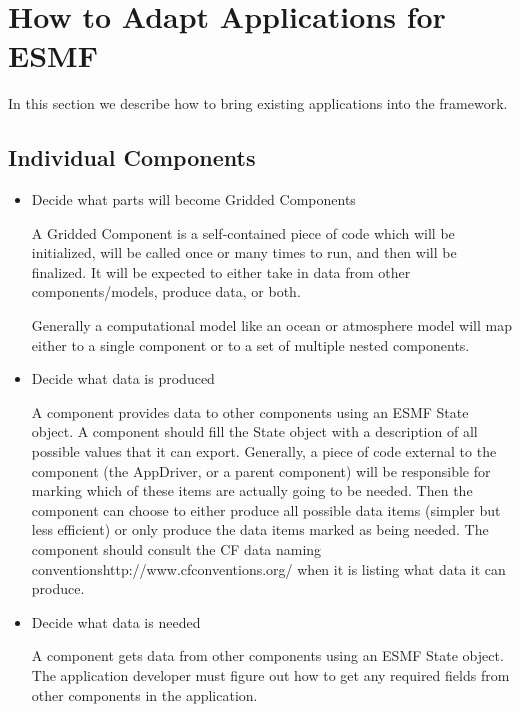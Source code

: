 
\section{How to Adapt Applications for ESMF}
\label{sec:Adoption}

In this section we describe how to bring existing applications 
into the framework.

\subsection{Individual Components}

\begin{itemize}

\item Decide what parts will become Gridded Components 

A Gridded Component is a self-contained
piece of code which will be initialized, will be called once or many times
to run, and then will be finalized.  It will be expected to either take in
data from other components/models, produce data, or both.

Generally a computational model like an ocean or atmosphere model will
map either to a single component or to a set of multiple nested
components.

\item Decide what data is produced 

A component provides data to other components using an ESMF State
object.  A component should fill the State object with a description of
all possible values that it can export.  Generally, a piece of code
external to the component (the AppDriver, or a parent component) will 
be responsible for marking which of these items are actually going to
be needed.  Then the component can choose to either produce all possible
data items (simpler but less efficient) or only produce the data items
marked as being needed.  The component should consult the \htmladdnormallink
{CF data naming conventions}{http://www.cfconventions.org/} when it is listing
what data it can produce.

\item Decide what data is needed 

A component gets data from other components using an ESMF State object.
The application developer must figure out how to get any required 
fields from other components in the application.


\end{itemize}
